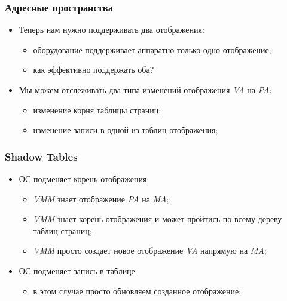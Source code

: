 \begin{frame}
\frametitle{Адресные пространства}
\begin{itemize}
  \item<1-> Теперь нам нужно поддерживать два отображения:
    \begin{itemize}
      \item оборудование поддерживает аппаратно только одно отображение;
      \item как эффективно поддержать оба?
    \end{itemize}
  \item<2-> Мы можем отслеживать два типа изменений отображения \emph{VA} на
        \emph{PA}:
    \begin{itemize}
      \item изменение корня таблицы страниц;
      \item изменение записи в одной из таблиц отображения;
    \end{itemize}
\end{itemize}
\end{frame}

\begin{frame}
\frametitle{Shadow Tables}
\begin{itemize}
  \item<1-> ОС подменяет корень отображения
    \begin{itemize}
      \item \emph{VMM} знает отображение \emph{PA} на \emph{MA};
      \item \emph{VMM} знает корень отображения и может пройтись по всему
            дереву таблиц страниц;
      \item \emph{VMM} просто создает новое отображение \emph{VA} напрямую на
            \emph{MA};
    \end{itemize}
  \item<2-> ОС подменяет запись в таблице
    \begin{itemize}
      \item в этом случае просто обновляем созданное отображение;
    \end{itemize}
\end{itemize}
\end{frame}

